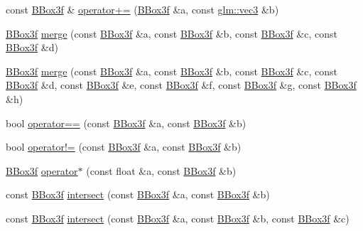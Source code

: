 \begin{DoxyCompactItemize}
\item 
const \hyperlink{structglimac_1_1_b_box3f}{B\+Box3f} \& \hyperlink{namespaceglimac_afdead8416fbbfd3ee6e2acf81206ace2}{operator+=} (\hyperlink{structglimac_1_1_b_box3f}{B\+Box3f} \&a, const \hyperlink{group__core__types_ga1c47e8b3386109bc992b6c48e91b0be7}{glm\+::vec3} \&b)
\item 
\hyperlink{structglimac_1_1_b_box3f}{B\+Box3f} \hyperlink{namespaceglimac_a8680d09f3e2292f083f6cefce95d41e7}{merge} (const \hyperlink{structglimac_1_1_b_box3f}{B\+Box3f} \&a, const \hyperlink{structglimac_1_1_b_box3f}{B\+Box3f} \&b, const \hyperlink{structglimac_1_1_b_box3f}{B\+Box3f} \&c, const \hyperlink{structglimac_1_1_b_box3f}{B\+Box3f} \&d)
\item 
\hyperlink{structglimac_1_1_b_box3f}{B\+Box3f} \hyperlink{namespaceglimac_a2c45c463e7e0e8e818226772ae1319d8}{merge} (const \hyperlink{structglimac_1_1_b_box3f}{B\+Box3f} \&a, const \hyperlink{structglimac_1_1_b_box3f}{B\+Box3f} \&b, const \hyperlink{structglimac_1_1_b_box3f}{B\+Box3f} \&c, const \hyperlink{structglimac_1_1_b_box3f}{B\+Box3f} \&d, const \hyperlink{structglimac_1_1_b_box3f}{B\+Box3f} \&e, const \hyperlink{structglimac_1_1_b_box3f}{B\+Box3f} \&f, const \hyperlink{structglimac_1_1_b_box3f}{B\+Box3f} \&g, const \hyperlink{structglimac_1_1_b_box3f}{B\+Box3f} \&h)
\item 
bool \hyperlink{namespaceglimac_a086462f9d14f3af4d2b3d00c9cf61d20}{operator==} (const \hyperlink{structglimac_1_1_b_box3f}{B\+Box3f} \&a, const \hyperlink{structglimac_1_1_b_box3f}{B\+Box3f} \&b)
\item 
bool \hyperlink{namespaceglimac_af0e6fe83c5779c89714d6a864e9f74ac}{operator!=} (const \hyperlink{structglimac_1_1_b_box3f}{B\+Box3f} \&a, const \hyperlink{structglimac_1_1_b_box3f}{B\+Box3f} \&b)
\item 
\hyperlink{structglimac_1_1_b_box3f}{B\+Box3f} \hyperlink{namespaceglimac_af5dfeb56647cba37ceb488d57120c9a2}{operator$\ast$} (const float \&a, const \hyperlink{structglimac_1_1_b_box3f}{B\+Box3f} \&b)
\item 
const \hyperlink{structglimac_1_1_b_box3f}{B\+Box3f} \hyperlink{namespaceglimac_adb0bbb865d3fd2206875ff7f350a43dc}{intersect} (const \hyperlink{structglimac_1_1_b_box3f}{B\+Box3f} \&a, const \hyperlink{structglimac_1_1_b_box3f}{B\+Box3f} \&b)
\item 
const \hyperlink{structglimac_1_1_b_box3f}{B\+Box3f} \hyperlink{namespaceglimac_a5ed913fdee93dbfdc38152ff4866e529}{intersect} (const \hyperlink{structglimac_1_1_b_box3f}{B\+Box3f} \&a, const \hyperlink{structglimac_1_1_b_box3f}{B\+Box3f} \&b, const \hyperlink{structglimac_1_1_b_box3f}{B\+Box3f} \&c)

\end{DoxyCompactItemize}
